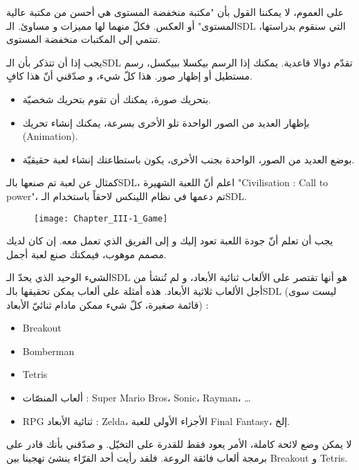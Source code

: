 على العموم، لا يمكننا القول بأن "مكتبة منخفضة المستوى هي أحسن من مكتبة عالية المستوى" أو العكس. فكلّ منهما لها مميزات و مساوئ. الـ\textenglish{SDL}
التي سنقوم بدراستها، تنتمي إلى المكتبات منخفضة المستوى.

يجب إذا أن تتذكر بأن الـ\textenglish{SDL}
تقدّم دوالا قاعدية. يمكنك إذا الرسم بيكسلا ببيكسل، رسم مستطيل أو إظهار صور. هذا كلّ شيء، و صدّقني أنّ هذا كافٍ.

\begin{itemize}
	\item بتحريك صورة، يمكنك أن تقوم بتحريك شخصيّة.
	\item بإظهار العديد من الصور الواحدة تلو الأخرى بسرعة، يمكنك إنشاء تحريك
	(\textenglish{Animation}).
	\item بوضع العديد من الصور، الواحدة بجنب الأخرى، يكون باستطاعتك إنشاء لعبة حقيقيّة.
\end{itemize}

كمثال عن لعبة تم صنعها بالـ\textenglish{SDL}،
اعلم أنّ اللعبة الشهيرة
"\textenglish{Civilisation : Call to power}"،
تم دعمها في نظام اللينكس لاحقاً باستخدام الـ\textenglish{SDL}.

\begin{figure}[H]
	\centering
	\texttt{[image: Chapter\_III-1\_Game]}
\end{figure}

يجب أن تعلم أنّ جودة اللعبة تعود إليك و إلى الفريق الذي تعمل معه. إن كان لديك مصمم موهوب، فيمكنك صنع لعبة أجمل.

الشيء الوحيد الذي يحدّ الـ\textenglish{SDL}
هو أنها تقتصر على الألعاب ثنائية الأبعاد، و لم تُنشأ من أجل الألعاب ثلاثية الأبعاد. هذه أمثلة على ألعاب يمكن تحقيقها بالـ\textenglish{SDL}
(ليست سوى قائمة صغيرة، كلّ شيء ممكن مادام ثنائيّ الأبعاد) :

\begin{itemize}
	\item \textenglish{Breakout}
	\item \textenglish{Bomberman}
	\item \textenglish{Tetris}
	\item ألعاب المنصّات :
	\textenglish{Super Mario Bros}، \textenglish{Sonic}، \textenglish{Rayman}، \dots
	\item \textenglish{RPG} ثنائية الأبعاد :
	\textenglish{Zelda}،
	الأجزاء الأولى للعبة
	\textenglish{Final Fantasy}،
	إلخ.
\end{itemize}
لا يمكن وضع لائحة كاملة، الأمر يعود فقط للقدرة على التخيّل. و صدّقني بأنك قادر على برمجة ألعاب فائقة الروعة. فلقد رأيت أحد القرّاء ينشئ تهجينا بين
\textenglish{Breakout}
و
\textenglish{Tetris}.

